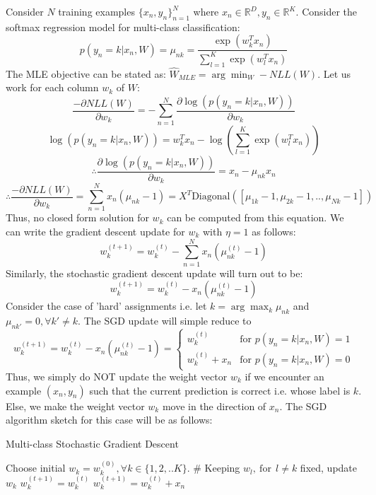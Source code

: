 \documentclass[a4paper,11pt]{article}
\begin{document}
\begin{mlsolution}
Consider $N$ training examples $\{x_n , y_n \}^{N}_{n=1}$ where $x_n \in \mathbb{R}^{D}, y_n \in \mathbb{R}^{K}$. Consider the softmax regression model for multi-class classification:
\[
p(y_n = k| x_n, W) = \mu_{nk} = \frac{\exp(w^{T}_{k}x_n)}{\sum_{l=1}^{K}\exp(w^{T}_{l}x_n)}
\]
The MLE objective can be stated as: $\hat{W}_{MLE} = \arg \min_{W} - NLL(W)$. Let us work for each column $w_k$ of $W$:
\[
\frac{-\partial NLL(W)}{\partial w_k} = -\sum_{n=1}^{N}\frac{ \partial\log(p(y_n=k|x_n,W))}{\partial w_k}
\]
\[
\log(p(y_n=k|x_n,W)) = w^{T}_k x_n - \log\left( \sum_{l=1}^{K}\exp(w^{T}_l x_n) \right) 
\]
\[
\therefore \frac{ \partial\log(p(y_n=k|x_n,W))}{\partial w_k} = x_n - \mu_{nk}x_n
\]
\[
\therefore \frac{-\partial NLL(W)}{\partial w_k} = \sum_{n=1}^{N}x_n(\mu_{nk}-1) = X^{T}\text{Diagonal}([\mu_{1k}-1, \mu_{2k}-1,..,\mu_{Nk}-1])
\]
Thus, no closed form solution for $w_k$ can be computed from this equation. We can write the gradient descent update for $w_k$ with $\eta = 1$ as follows:
\[
\boxed{w^{(t+1)}_{k} = w^{(t)}_{k} - \sum_{n=1}^{N}x_n\left( \mu^{(t)}_{nk}-1\right) }
\]
Similarly, the stochastic gradient descent update will turn out to be:
\[
\boxed{w^{(t+1)}_{k} = w^{(t)}_{k} - x_n(\mu^{(t)}_{nk}-1) }
\]
Consider the case of 'hard' assignments i.e. let $k = \arg \max_{k} \mu_{nk}$ and $\mu_{nk'} = 0, \forall k' \neq k$. The SGD update will simple reduce to 
\[
w^{(t+1)}_{k} = w^{(t)}_{k} - x_n(\mu^{(t)}_{nk}-1) =
\begin{cases}
w^{(t)}_{k} & \text{for }p(y_n=k|x_n, W) = 1\\    
w^{(t)}_{k} + x_n  & \text{for }p(y_n=k|x_n, W) = 0
\end{cases}
\]
Thus, we simply do NOT update the weight vector $w_k$ if we encounter an example $(x_n, y_n)$ such that the current prediction  is correct i.e. whose label is $k$. Else, we make the weight vector $w_k$ move in the direction of $x_n$. The SGD algorithm sketch for this case will be as follows:

\begin{algorithm}
	\caption{Multi-class Stochastic Gradient Descent}\label{alg:gibbs}
	\begin{algorithmic}[5]
		\State Choose initial $w_k = w^{(0)}_k, \forall k \in \{1,2,..K\}$.
		\State $\#$ Keeping $w_{l}, \  \text{for}\ \  l \neq k$ fixed, update $w_k$
		\State $w^{(t+1)}_k = w^{(t)}_k$
		\Else
		\State $w^{(t+1)}_k = w^{(t)}_k + x_n$
		\EndIf
		\EndFor
		\EndFor
	\end{algorithmic}
\end{algorithm}

\end{mlsolution}
	
\end{document}
